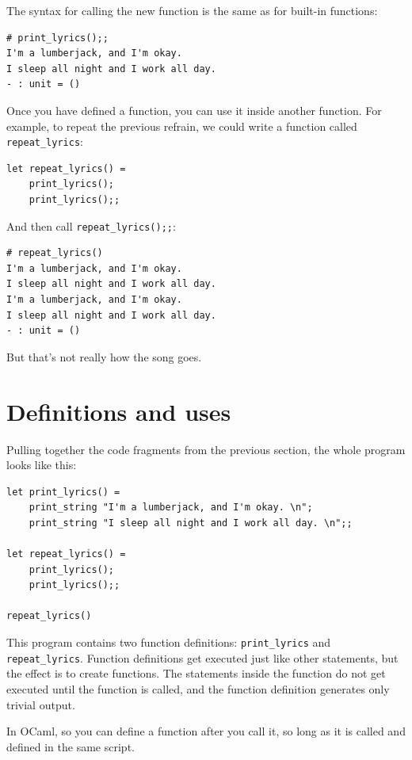 \documentclass[10pt]{book}
\begin{document}

The syntax for calling the new function is the same as for built-in functions:

\beforeverb
\begin{verbatim}
# print_lyrics();;
I'm a lumberjack, and I'm okay.
I sleep all night and I work all day.
- : unit = ()
\end{verbatim}
\afterverb
%
Once you have defined a function, you can use it inside another
function.  For example, to repeat the previous refrain, we could write
a function called \verb"repeat_lyrics":

\beforeverb
\begin{verbatim}
let repeat_lyrics() = 
    print_lyrics();
    print_lyrics();;
\end{verbatim}
\afterverb
%
And then call \verb"repeat_lyrics();;":

\beforeverb
\begin{verbatim}
# repeat_lyrics()
I'm a lumberjack, and I'm okay.
I sleep all night and I work all day.
I'm a lumberjack, and I'm okay.
I sleep all night and I work all day.
- : unit = ()
\end{verbatim}
\afterverb
%
But that's not really how the song goes.


\section{Definitions and uses}

Pulling together the code fragments from the previous section, the
whole program looks like this:

\beforeverb
\begin{verbatim}
let print_lyrics() =
    print_string "I'm a lumberjack, and I'm okay. \n";
    print_string "I sleep all night and I work all day. \n";;

let repeat_lyrics() =
    print_lyrics();
    print_lyrics();;

repeat_lyrics()
\end{verbatim}
\afterverb
%
This program contains two function definitions: \verb"print_lyrics" and
\verb"repeat_lyrics".  Function definitions get executed just like other
statements, but the effect is to create functions.  The statements
inside the function do not get executed until the function is called, and
the function definition generates only trivial output.

In OCaml, so you can define a function after you call it, so long as it is 
called and defined in the same script.
\end{document}
